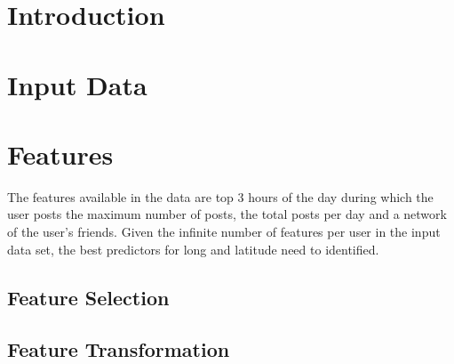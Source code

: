 

\section{Introduction}

\section{Input Data}

\section{Features}
The features available in the data are top 3 hours of the day during which the user posts the maximum number of posts, the total posts per day and  a network of the user's friends. Given the infinite number of features per user in the input data set, the best predictors for long and latitude need to identified. \cite{Guyon2003}



\subsection{Feature Selection}

\lipsum[1]\vspace{10pt} %


\subsection{Feature Transformation}
